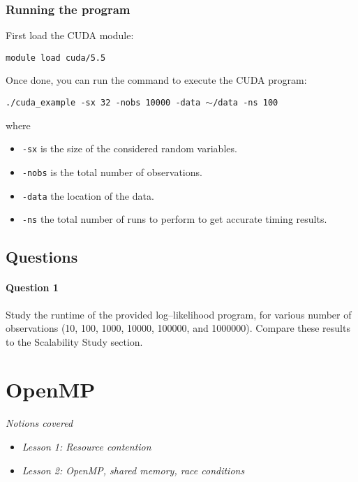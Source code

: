 \documentclass[letterpaper,10pt]{article}
\begin{document}
\subsubsection{Running the program} First load the CUDA module:
\begin{center}
 \texttt{module load cuda/5.5}
\end{center}
Once done, you can run the command to execute the CUDA program:
\begin{center}
 \texttt{./cuda\_example -sx 32 -nobs 10000 -data $\sim$/data -ns 100} 
\end{center}
where
\begin{itemize}
 \item \texttt{-sx} is the size of the considered random variables.
 \item \texttt{-nobs} is the total number of observations.
 \item \texttt{-data} the location of the data.
 \item \texttt{-ns} the total number of runs to perform to get accurate timing results.
 \end{itemize}

\subsection{Questions}

\paragraph{Question 1} Study the runtime of the provided log--likelihood program, for various number of observations (10, 100, 1000, 10000, 100000, and 1000000). Compare these results to the Scalability Study section.
% 


\newpage


\section{OpenMP}
\textit{Notions covered}
\begin{itemize}
 \item \textit{Lesson 1: Resource contention}
 \item \textit{Lesson 2: OpenMP, shared memory, race conditions}
\end{itemize}
\end{document}
